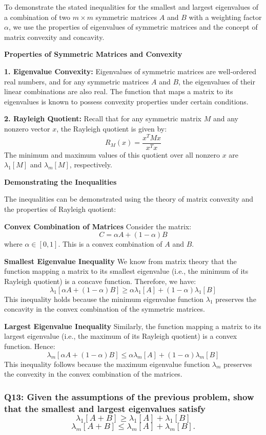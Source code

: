 \documentclass[8pt]{article}
\begin{document}
{To demonstrate the stated inequalities for the smallest and largest eigenvalues of a combination of two \(m \times m\) symmetric matrices \(A\) and \(B\) with a weighting factor \(\alpha\), we use the properties of eigenvalues of symmetric matrices and the concept of matrix convexity and concavity.

\textbf{Properties of Symmetric Matrices and Convexity}

\textbf{1. Eigenvalue Convexity:}
   Eigenvalues of symmetric matrices are well-ordered real numbers, and for any symmetric matrices \(A\) and \(B\), the eigenvalues of their linear combinations are also real. The function that maps a matrix to its eigenvalues is known to possess convexity properties under certain conditions.

\textbf{2. Rayleigh Quotient:}
   Recall that for any symmetric matrix \(M\) and any nonzero vector \(x\), the Rayleigh quotient is given by:
   \[
   R_M(x) = \frac{x^T M x}{x^T x}
   \]
   The minimum and maximum values of this quotient over all nonzero \(x\) are \(\lambda_1[M]\) and \(\lambda_m[M]\), respectively.

\textbf{Demonstrating the Inequalities}

The inequalities can be demonstrated using the theory of matrix convexity and the properties of Rayleigh quotient:

\textbf{Convex Combination of Matrices}
Consider the matrix:
\[
C = \alpha A + (1 - \alpha) B
\]
where \(\alpha \in [0, 1]\). This is a convex combination of \(A\) and \(B\).

\textbf{Smallest Eigenvalue Inequality}
We know from matrix theory that the function mapping a matrix to its smallest eigenvalue (i.e., the minimum of its Rayleigh quotient) is a concave function. Therefore, we have:
\[
\lambda_1[\alpha A + (1 - \alpha) B] \geq \alpha \lambda_1[A] + (1 - \alpha) \lambda_1[B]
\]
This inequality holds because the minimum eigenvalue function \(\lambda_1\) preserves the concavity in the convex combination of the symmetric matrices.

\textbf{Largest Eigenvalue Inequality}
Similarly, the function mapping a matrix to its largest eigenvalue (i.e., the maximum of its Rayleigh quotient) is a convex function. Hence:
\[
\lambda_m[\alpha A + (1 - \alpha) B] \leq \alpha \lambda_m[A] + (1 - \alpha) \lambda_m[B]
\]
This inequality follows because the maximum eigenvalue function \(\lambda_m\) preserves the convexity in the convex combination of the matrices.

\subsubsection*{Q13: Given the assumptions of the previous problem, show that the smallest and largest eigenvalues satisfy
\[
\lambda_1[A + B] \geq \lambda_1[A] + \lambda_1[B]
\]
\[
\lambda_m[A + B] \leq \lambda_m[A] + \lambda_m[B].
\]
}

}
\end{document}
